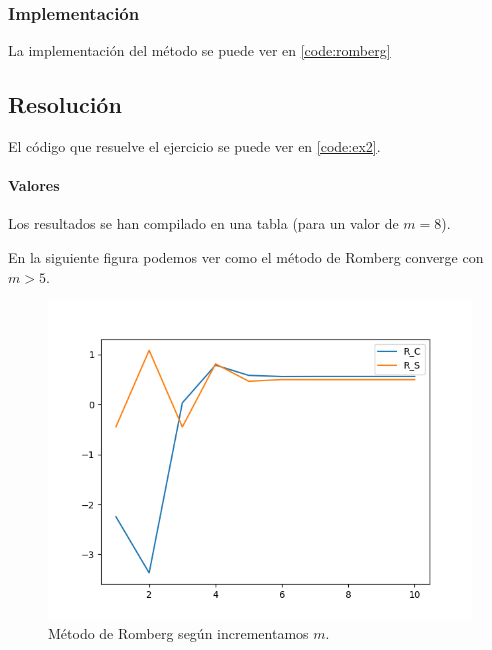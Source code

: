 \subsubsection{Implementación}

La implementación del método se puede ver en \ref{code:romberg}

\subsection{Resolución}


El código que resuelve el ejercicio se puede ver en \ref{code:ex2}. 

\paragraph{Valores} Los resultados se han compilado en una tabla (para un valor de $m= 8$).


\begin{table}[H]
	\centering
\end{table}

En la siguiente figura podemos ver como el método de Romberg converge con $m > 5$.

\begin{figure}[h!]
	\centering
	\includegraphics[width=\linewidth]{figures/romb_for_m.png}
	\caption{Método de Romberg según incrementamos $m$.}
	\label{fig:romb_for_m}
\end{figure}
